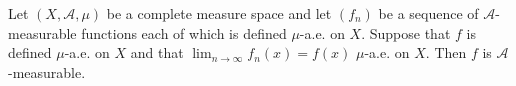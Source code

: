Let $(X, \mathcal{A}, \mu)$ be a complete measure space and let $(f_n)$ be a sequence of $\mathcal{A}$-measurable functions each of which is defined $\mu$-a.e. on $X$. Suppose that $f$ is defined $\mu$-a.e. on $X$ and that $\lim_{n \to \infty} f_n(x) = f(x)$ $\mu$-a.e. on $X$. Then $f$ is $\mathcal{A}$-measurable.